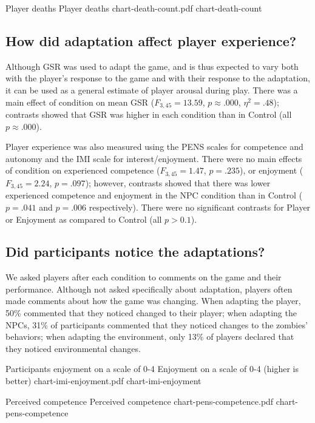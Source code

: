 \img
{Player deaths}
{Player deaths}
{chart-death-count.pdf}
{chart-death-count}

\subsection{How did adaptation affect player experience?}

Although GSR was used to adapt the game, and is thus expected to vary both with the player's response to the game and with their response to the adaptation, it can be used as a general estimate of player arousal during play. There was a main effect of condition on mean GSR ($F_{3,45} = 13.59$, $p \approx .000$, $\eta^{2} = .48$); contrasts showed that GSR was higher in each condition than in Control (all $p \approx .000$).

Player experience was also measured using the PENS scales for competence and autonomy and the IMI scale for interest/enjoyment. There were no main effects of condition on experienced competence ($F_{3,45} = 1.47$, $p = .235$), or enjoyment ($F_{3,45} = 2.24$, $p = .097$); however, contrasts showed that there was lower experienced competence and enjoyment in the NPC condition than in Control ($p = .041$ and $p = .006$ respectively). There were no significant contrasts for Player or Enjoyment as compared to Control (all $p > 0.1$).

\subsection{Did participants notice the adaptations?}

We asked players after each condition to comments on the game and their performance. Although not asked specifically about adaptation, players often made comments about how the game was changing. When adapting the player, 50\% commented that they noticed changed to their player; when adapting the NPCs, 31\% of participants commented that they noticed changes to the zombies' behaviors; when adapting the environment, only 13\% of players declared that they noticed environmental changes.


\img
{Participants enjoyment on a scale of 0-4}
{Enjoyment on a scale of 0-4 (higher is better)}
{chart-imi-enjoyment.pdf}
{chart-imi-enjoyment}

\img
{Perceived competence}
{Perceived competence}
{chart-pens-competence.pdf}
{chart-pens-competence}

